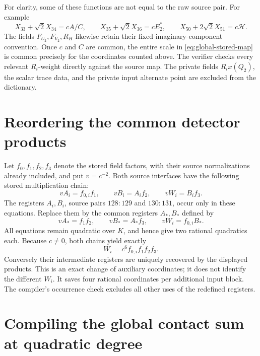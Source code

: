 \documentclass[11pt]{article}
\begin{document}
For clarity, some of these functions are not equal to the raw source
pair. For example
\[
 X_{33}+\sqrt2X_{34}=cA/C,\qquad
 X_{35}+\sqrt2X_{36}=cE_2^*,\qquad
 X_{50}+2\sqrt2X_{51}=c\mathcal H.
\]
The fields \(F_{U_2},F_{V_2},R_H\) likewise retain their fixed
imaginary-component convention. Once \(c\) and \(C\) are common,
the entire scale in \eqref{eq:global-stored-map} is common precisely
for the coordinates counted above. The verifier checks every relevant
\(R_i\)-weight directly against the source map. The private fields
\(R_i x(Q_2)\), the scalar trace data, and the private input alternate
point are excluded from the dictionary.

\section{Reordering the common detector products}

Let \(f_0,f_1,f_2,f_3\) denote the stored field factors, with their
source normalizations already included, and put \(v=c^{-2}\).
Both source interfaces have the following stored multiplication
chain:
\[
                vA_i=f_{0,i}f_1,\qquad
                vB_i=A_i f_2,\qquad
                vW_i=B_i f_3.
\]
The registers \(A_i,B_i\), source pairs \(128:129\) and
\(130:131\), occur only in these equations. Replace them by the
common registers \(A_*,B_*\) defined by
\begin{equation}\label{eq:global-reordered-product}
                vA_*=f_1f_2,\qquad
                vB_*=A_*f_3,\qquad
                vW_i=f_{0,i}B_*.
\end{equation}
All equations remain quadratic over \(K\), and hence give two
rational quadratics each. Because \(c\ne0\), both chains yield
exactly
\[
                       W_i=c^6f_{0,i}f_1f_2f_3.
\]
Conversely their intermediate registers are uniquely recovered by
the displayed products. This is an exact change of auxiliary
coordinates; it does not identify the different \(W_i\).
It saves four rational coordinates per additional input block.
The compiler's occurrence check excludes all other uses of the
redefined registers.

\section{Compiling the global contact sum at quadratic degree}
\end{document}
